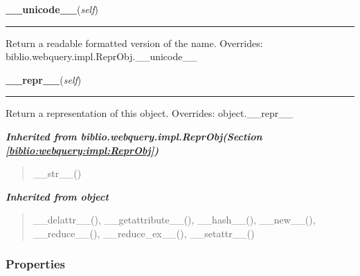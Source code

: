 \hspace{.8\funcindent}\begin{boxedminipage}{\funcwidth}

    \raggedright \textbf{\_\_unicode\_\_}(\textit{self})

    \vspace{-1.5ex}

    \rule{\textwidth}{0.5\fboxrule}
\setlength{\parskip}{2ex}

Return a readable formatted version of the name.
\setlength{\parskip}{1ex}
      Overrides: biblio.webquery.impl.ReprObj.\_\_unicode\_\_

    \end{boxedminipage}

    \vspace{0.5ex}

\hspace{.8\funcindent}\begin{boxedminipage}{\funcwidth}

    \raggedright \textbf{\_\_repr\_\_}(\textit{self})

    \vspace{-1.5ex}

    \rule{\textwidth}{0.5\fboxrule}
\setlength{\parskip}{2ex}

Return a representation of this object.
\setlength{\parskip}{1ex}
      Overrides: object.\_\_repr\_\_

    \end{boxedminipage}


\large{\textbf{\textit{Inherited from biblio.webquery.impl.ReprObj\textit{(Section \ref{biblio:webquery:impl:ReprObj})}}}}

\begin{quote}
\_\_str\_\_()
\end{quote}

\large{\textbf{\textit{Inherited from object}}}

\begin{quote}
\_\_delattr\_\_(), \_\_getattribute\_\_(), \_\_hash\_\_(), \_\_new\_\_(), \_\_reduce\_\_(), \_\_reduce\_ex\_\_(), \_\_setattr\_\_()
\end{quote}


  \subsubsection{Properties}


